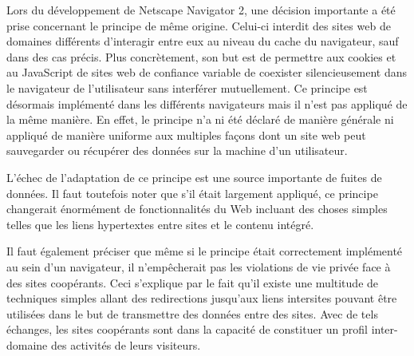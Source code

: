 Lors du développement de Netscape Navigator 2, une décision importante a été prise concernant le principe de même origine. Celui-ci interdit des sites web de domaines différents d'interagir entre eux au niveau du cache du navigateur, sauf dans des cas précis. Plus concrètement, son but est de permettre aux cookies et au JavaScript de sites web de confiance variable de coexister silencieusement dans le navigateur de l'utilisateur sans interférer mutuellement. Ce principe est désormais implémenté dans les différents navigateurs mais il n'est pas appliqué de la même manière. En effet, le principe n'a ni été déclaré de manière générale ni appliqué de manière uniforme aux multiples façons dont un site web peut sauvegarder ou récupérer des données sur la machine d'un utilisateur.
\newline

L'échec de l'adaptation de ce principe est une source importante de fuites de données. Il faut toutefois noter que s'il était largement appliqué, ce principe changerait énormément de fonctionnalités du Web incluant des choses simples telles que les liens hypertextes entre sites et le contenu intégré.
\newline

Il faut également préciser que même si le principe était correctement implémenté au sein d'un navigateur, il n'empêcherait pas les violations de vie privée face à des sites coopérants. Ceci s'explique par le fait qu'il existe une multitude de techniques simples allant des redirections jusqu'aux liens intersites pouvant être utilisées dans le but de transmettre des données entre des sites. Avec de tels échanges, les sites coopérants sont dans la capacité de constituer un profil inter-domaine des activités de leurs visiteurs.
\newline

